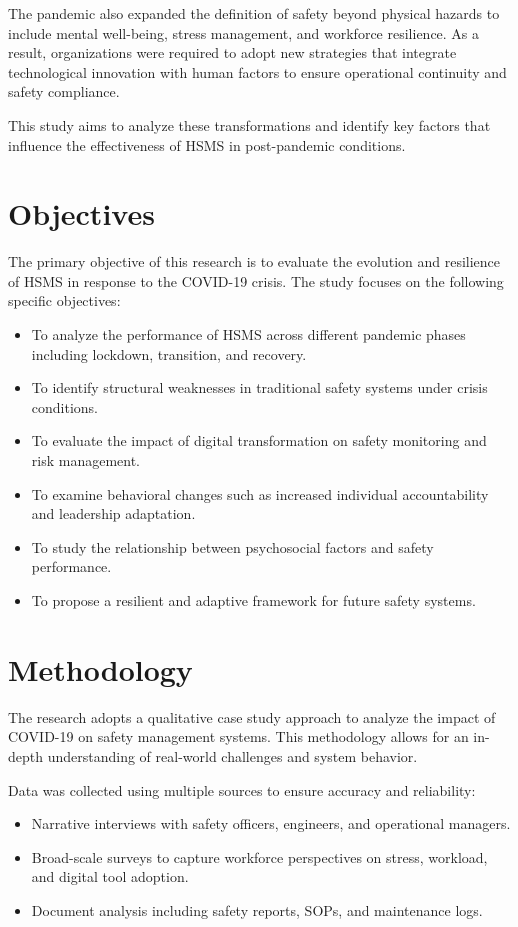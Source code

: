 \documentclass[conference]{IEEEtran}
\begin{document}
The pandemic also expanded the definition of safety beyond physical hazards to include mental well-being, stress management, and workforce resilience. As a result, organizations were required to adopt new strategies that integrate technological innovation with human factors to ensure operational continuity and safety compliance.

This study aims to analyze these transformations and identify key factors that influence the effectiveness of HSMS in post-pandemic conditions.

\section{Objectives}

The primary objective of this research is to evaluate the evolution and resilience of HSMS in response to the COVID-19 crisis. The study focuses on the following specific objectives:

\begin{itemize}
\item To analyze the performance of HSMS across different pandemic phases including lockdown, transition, and recovery.
\item To identify structural weaknesses in traditional safety systems under crisis conditions.
\item To evaluate the impact of digital transformation on safety monitoring and risk management.
\item To examine behavioral changes such as increased individual accountability and leadership adaptation.
\item To study the relationship between psychosocial factors and safety performance.
\item To propose a resilient and adaptive framework for future safety systems.
\end{itemize}

\section{Methodology}

The research adopts a qualitative case study approach to analyze the impact of COVID-19 on safety management systems. This methodology allows for an in-depth understanding of real-world challenges and system behavior.

Data was collected using multiple sources to ensure accuracy and reliability:

\begin{itemize}
\item Narrative interviews with safety officers, engineers, and operational managers.
\item Broad-scale surveys to capture workforce perspectives on stress, workload, and digital tool adoption.
\item Document analysis including safety reports, SOPs, and maintenance logs.
\end{itemize}
\end{document}
